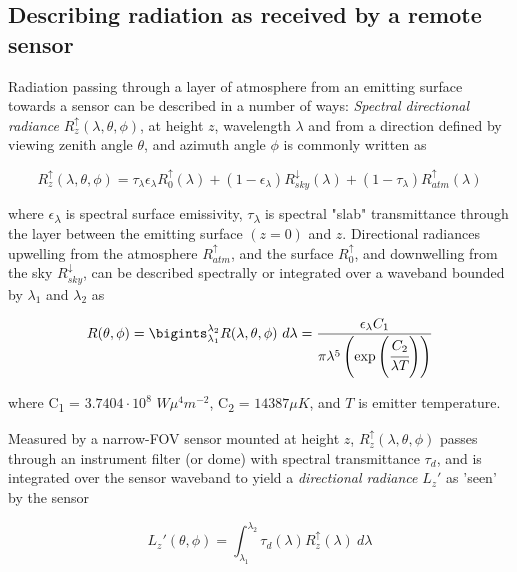 \begin{bibunit}
\subsection{Describing radiation as received by a remote sensor}

Radiation passing through a layer of atmosphere from an emitting surface towards a sensor can be described in a number of ways: \textit{Spectral directional radiance} $R^\uparrow_z (\lambda, \theta, \phi)$, at height $ z $, wavelength $\lambda$ and from a direction defined by viewing zenith angle \(\theta\), and azimuth angle \(\phi\) is commonly written as

\begin{equation}
R^\uparrow_z (\lambda, \theta, \phi) = \tau_\lambda \epsilon_\lambda R^\uparrow_0(\lambda) + (1-\epsilon_\lambda) R^\downarrow_{sky} (\lambda) + (1-\tau_\lambda) R^\uparrow_{atm}(\lambda)
\end{equation}

\noindent where \(\epsilon\)\textsubscript{\( \lambda \)} is spectral surface emissivity, \(\tau\)\textsubscript{\( \lambda \)} is spectral "slab" transmittance through the layer between the emitting surface $( z  = 0) $ and $ z $. Directional radiances upwelling from the atmosphere $R^\uparrow_{atm}$, and the surface $R^\uparrow_0$, and downwelling from the sky $R^\downarrow_{sky}$, can be described spectrally or integrated over a waveband bounded by \(\lambda_1\) and \(\lambda_2\) as

\begin{equation}
R(\theta, \phi) = \bigints_{\lambda_1}^{\lambda_2} R(\lambda,\theta, \phi) ~ d\lambda =\displaystyle\frac{\epsilon_\lambda C_1}{\pi \lambda^5 \left( \exp\left(\cfrac{C_2}{\lambda T}\right)\right)}
\end{equation}

\noindent where C\textsubscript{1} = $ 3.7404 \cdot 10^8 $ $ W\mu^4 m^{-2} $, C\textsubscript{2} = $ 14387 \mu K $, and $T$ is emitter temperature.

Measured by a narrow-FOV sensor mounted at height $ z $, $R^\uparrow_z (\lambda, \theta, \phi)$ passes through an instrument filter (or dome) with spectral transmittance \(\tau_d\), and is integrated over the sensor waveband to yield a \textit{directional radiance} $L_z'$ as 'seen' by the sensor

\begin{equation}
L_z' (\theta, \phi) = \int_{\lambda_1}^{\lambda_2} \tau_d(\lambda) R^\uparrow_z(\lambda) ~ d\lambda
\end{equation}


\end{bibunit}
